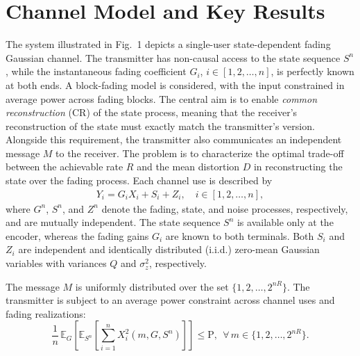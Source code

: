 \documentclass[journal]{IEEEtran}
\begin{document}
\section{Channel Model and Key Results} \label{sec:sys}
The system illustrated in Fig.~1 depicts a single-user state-dependent fading Gaussian channel. The transmitter has non-causal access to the state sequence $S^n$, while the instantaneous fading coefficient $G_i$, $i \in [1,2,\ldots,n]$, is perfectly known at both ends.
A block-fading model is considered, with the input constrained in average power across fading blocks. The central aim is to enable \emph{common reconstruction} (CR) of the state process, meaning that the receiver’s reconstruction of the state must exactly match the transmitter’s version. Alongside this requirement, the transmitter also communicates an independent message $M$ to the receiver. The problem is to characterize the optimal trade-off between the achievable rate $R$ and the mean distortion $D$ in reconstructing the state over the fading process. Each channel use is described by
\begin{align}
Y_i = G_i X_i + S_i + Z_i, \quad i \in [1,2,\ldots,n], \label{eq:model}
\end{align}
where $G^n$, $S^n$, and $Z^n$ denote the fading, state, and noise processes, respectively, and are mutually independent. The state sequence $S^n$ is available only at the encoder, whereas the fading gains $G_i$ are known to both terminals. Both $S_i$ and $Z_i$ are independent and identically distributed (i.i.d.) zero-mean Gaussian variables with variances $Q$ and $\sigma_z^2$, respectively.  

The message $M$ is uniformly distributed over the set $\{1,2,\ldots,2^{nR}\}$. The transmitter is subject to an average power constraint across channel uses and fading realizations:
\begin{equation*}
    \frac{1}{n} \, \mathbb{E}_{G}\!\left[\mathbb{E}_{S^n}\!\left[\sum_{i=1}^{n} X_i^2(m,G,S^n)\right]\right] \leq \mathrm{P}, 
    \:\: \forall \, m \in \{1,2,\ldots,2^{nR}\}.
\end{equation*}
\end{document}
